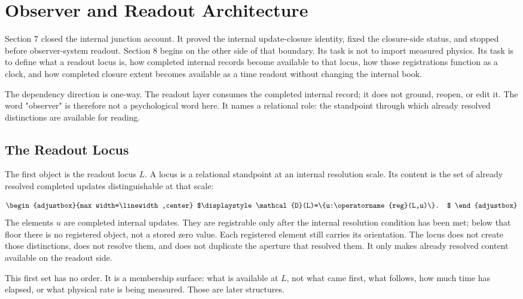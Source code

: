 \section{Observer and Readout Architecture}
\label{sec:08}
Section 7 closed the internal junction account. It proved the internal update-closure identity, fixed the closure-side status, and stopped before observer-system readout. Section 8 begins on the other side of that boundary. Its task is not to import measured physics. Its task is to define what a readout locus is, how completed internal records become available to that locus, how those registrations function as a clock, and how completed closure extent becomes available as a time readout without changing the internal book.

The dependency direction is one-way. The readout layer consumes the completed internal record; it does not ground, reopen, or edit it. The word "observer" is therefore not a psychological word here. It names a relational role: the standpoint through which already resolved distinctions are available for reading.

\subsection{The Readout Locus}
The first object is the readout locus \(L\). A locus is a relational standpoint at an internal resolution scale. Its content is the set of already resolved completed updates distinguishable at that scale:

\begin{equation*}
\begin{adjustbox}{max width=\linewidth,center}
$\displaystyle
\mathcal{D}(L)=\{u:\operatorname{reg}(L,u)\}.
$
\end{adjustbox}
\end{equation*}
The elements \(u\) are completed internal updates. They are registrable only after the internal resolution condition has been met; below that floor there is no registered object, not a stored zero value. Each registered element still carries its orientation. The locus does not create those distinctions, does not resolve them, and does not duplicate the aperture that resolved them. It only makes already resolved content available on the readout side.

This first set has no order. It is a membership surface: what is available at \(L\), not what came first, what follows, how much time has elapsed, or what physical rate is being measured. Those are later structures.

